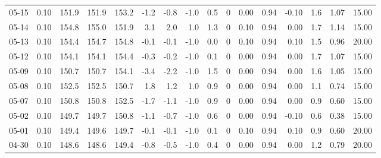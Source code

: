 \begin{threeparttable}
{\begin{tabular}{lrrrrrrrrrrrrrrr}
  05-15 &     0.10 & 151.9 & 151.9 & 153.2 &       -1.2 &           -0.8 &                     -1.0 &                 0.5 &              0 &       0.00 &      0.94 &          -0.10 &              1.6 &            1.07 &                  15.00 \\
  05-14 &     0.10 & 154.8 & 155.0 & 151.9 &        3.1 &            2.0 &                      1.0 &                 1.3 &              0 &       0.10 &      0.94 &           0.00 &              1.7 &            1.14 &                  15.00 \\
  05-13 &     0.10 & 154.4 & 154.7 & 154.8 &       -0.1 &           -0.1 &                     -1.0 &                 0.0 &              0 &       0.10 &      0.94 &           0.10 &              1.5 &            0.96 &                  20.00 \\
  05-12 &     0.10 & 154.1 & 154.1 & 154.4 &       -0.3 &           -0.2 &                     -1.0 &                 0.1 &              0 &       0.00 &      0.94 &           0.00 &              1.7 &            1.07 &                  15.00 \\
  05-09 &     0.10 & 150.7 & 150.7 & 154.1 &       -3.4 &           -2.2 &                     -1.0 &                 1.5 &              0 &       0.00 &      0.94 &           0.00 &              1.6 &            1.05 &                  15.00 \\
  05-08 &     0.10 & 152.5 & 152.5 & 150.7 &        1.8 &            1.2 &                      1.0 &                 0.9 &              0 &       0.00 &      0.94 &           0.00 &              1.1 &            0.74 &                  15.00 \\
  05-07 &     0.10 & 150.8 & 150.8 & 152.5 &       -1.7 &           -1.1 &                     -1.0 &                 0.9 &              0 &       0.00 &      0.94 &           0.00 &              0.9 &            0.60 &                  15.00 \\
  05-02 &     0.10 & 149.7 & 149.7 & 150.8 &       -1.1 &           -0.7 &                     -1.0 &                 0.6 &              0 &       0.00 &      0.94 &          -0.10 &              0.6 &            0.38 &                  15.00 \\
  05-01 &     0.10 & 149.4 & 149.6 & 149.7 &       -0.1 &           -0.1 &                     -1.0 &                 0.1 &              0 &       0.10 &      0.94 &           0.10 &              0.9 &            0.60 &                  20.00 \\
  04-30 &     0.10 & 148.6 & 148.6 & 149.4 &       -0.8 &           -0.5 &                     -1.0 &                 0.4 &              0 &       0.00 &      0.94 &           0.00 &              1.2 &            0.79 &                  20.00 \\

\end{tabular}}
\end{threeparttable}

